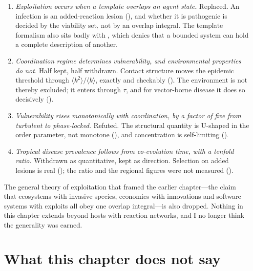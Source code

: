 \begin{enumerate}[nosep,label=(\arabic*)]
\item \emph{Exploitation occurs when a template overlaps an agent state.}
      Replaced. An infection is an added-reaction lesion
      (), and whether it is pathogenic is decided by
      the viability set, not by an overlap integral. The template formalism
      also sits badly with , which denies that a
      bounded system can hold a complete description of another.
\item \emph{Coordination regime determines vulnerability, and environmental
      properties do not.} Half kept, half withdrawn. Contact structure moves
      the epidemic threshold through $\langle k^2\rangle/\langle k\rangle$,
      exactly and checkably (). The
      environment is not thereby excluded; it enters through $\tau$, and for
      vector-borne disease it does so decisively
      ().
\item \emph{Vulnerability rises monotonically with coordination, by a factor
      of five from turbulent to phase-locked.} Refuted. The structural
      quantity is U-shaped in the order parameter, not monotone
      (), and concentration is self-limiting
      ().
\item \emph{Tropical disease prevalence follows from co-evolution time, with
      a tenfold ratio.} Withdrawn as quantitative, kept as direction.
      Selection on added lesions is real (); the ratio
      and the regional figures were not measured
      ().
\end{enumerate}

The general theory of exploitation that framed the earlier chapter---the
claim that ecosystems with invasive species, economies with innovations and
software systems with exploits all obey one overlap integral---is also
dropped. Nothing in this chapter extends beyond hosts with reaction
networks, and I no longer think the generality was earned.

\section{What this chapter does not say}
\label{sm:sec:limits}

